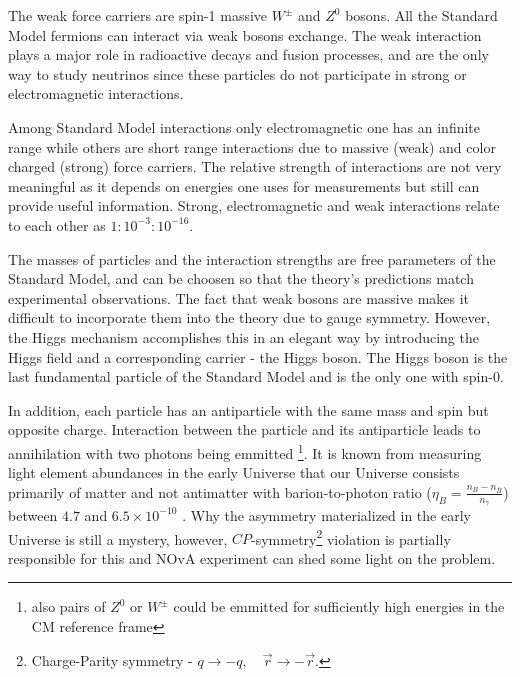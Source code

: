The weak force carriers are spin-1 massive $W^\pm$ and $Z^0$ bosons. All the Standard Model fermions 
can interact via weak bosons exchange. The weak interaction plays a major role in radioactive decays and 
fusion processes, and are the only way to study neutrinos since these particles do not participate in strong or
electromagnetic interactions.

Among Standard Model interactions only electromagnetic one has an infinite range while others
are short range interactions due to massive (weak) and color charged (strong) force carriers. 
The relative strength of interactions are not very meaningful as it depends on energies one uses
for measurements but still can provide useful information. Strong, electromagnetic and weak interactions
relate to each other as $1:10^{-3}:10^{-16}$.

The masses of particles and the interaction strengths are free parameters of the Standard Model, and
can be choosen so that the theory's predictions match experimental observations. The fact that weak bosons
are massive makes it difficult to incorporate them into the theory due to gauge symmetry. However, the
Higgs mechanism accomplishes this in an elegant way by introducing the Higgs field and a corresponding
carrier - the Higgs boson. The Higgs boson is the last fundamental particle of the Standard Model and
is the only one with spin-0.

In addition, each particle has an antiparticle with the same mass and spin but opposite charge. 
Interaction between the particle and its antiparticle leads to annihilation with two photons being emmitted
\footnote{also pairs of $Z^0$ or $W^\pm$ could be emmitted for sufficiently high energies in the CM reference frame}.
It is known from measuring light element abundances in the early Universe that our Universe consists primarily 
of matter and not antimatter with barion-to-photon ratio ($\eta_B = \frac{n_B - n_{\bar{B}}}{n_\gamma}$) between
$4.7$ and $6.5\times 10^{-10}$ \cite{barionratio}. Why the asymmetry materialized in the early Universe is
still a mystery, however, $CP$-symmetry\footnote{Charge-Parity symmetry - $q \rightarrow -q, \quad 
\vec{r} \rightarrow -\vec{r}$.} violation is partially responsible for this and NOvA experiment can 
shed some light on the problem. 


